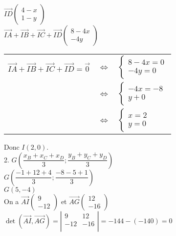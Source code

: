 $\overrightarrow{ID}\left(\begin{array}{c} 4 - x\\ 1 - y \end{array}\right)$ \\

$ \overrightarrow{IA} + \overrightarrow{IB} + \overrightarrow{IC} + \overrightarrow{ID} \left(\begin{array}{c} 8 - 4x\\ -4y \end{array}\right)$ \\

\begin{tabular}{lll}
$\overrightarrow{IA} + \overrightarrow{IB} + \overrightarrow{IC} + \overrightarrow{ID} = \overrightarrow{0}$ & $\Longleftrightarrow$&  $ \begin{cases} 8 - 4x = 0 \\ -4y = 0 \end{cases}$ \\
& $\Longleftrightarrow$ & $\begin{cases}-4x = -8 \\ y + 0 \end{cases}$ \\
& $\Longleftrightarrow$ & $\begin{cases} x = 2 \\ y = 0 \end{cases}$ \\
\end{tabular}

Donc $I\left(2,0\right)$.\\

2. $G\left(\dfrac{x_B + x_C + x_D}{3} ; \dfrac{y_B + y_C + y_D}{3}\right)$\\

$ G\left(\dfrac{-1 + 12+ 4}{3} ; \dfrac{-8 - 5 + 1}{3}\right)$\\

$ G \left(5,-4\right) $\\

On a $\overrightarrow{AI}\left(\begin{array}{c} 9\\ -12 \end{array}\right)$ et $\overrightarrow{AG}\left(\begin{array}{c} 12\\ -16 \end{array}\right)$\\

$\det\left(\overrightarrow{AI}, \overrightarrow{AG}\right) = \left| \begin{array}{cc}  9 & 12 \\ -12 & -16  \\ \end{array} \right| = - 144 - \left(-140\right) = 0 $\\

